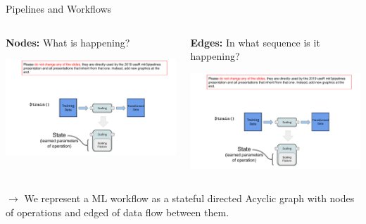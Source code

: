 	\begin{frame}{Pipelines and Workflows}
		\begin{columns}
			\begin{column}{0.5\textwidth}
				\textbf{Nodes:} What is happening? 
				\begin{center}
					\includegraphics[page=8, width=\textwidth, trim=200 0 30 190, clip]{images/mlr3Pipelines_graphics}
				\end{center}
			\end{column}%
			\begin{column}{0.5\textwidth}
				\textbf{Edges:} In what sequence is it happening? 
				\begin{center}
					\includegraphics[page=9, width=\textwidth, trim=200 0 30 190, clip]{images/mlr3Pipelines_graphics}
				\end{center}
			\end{column}
		\end{columns}
		
	\vspace{1cm}

	$\longrightarrow$ We represent a ML workflow as a stateful directed Acyclic graph with nodes of operations and edged of data flow between them.

	\end{frame}


